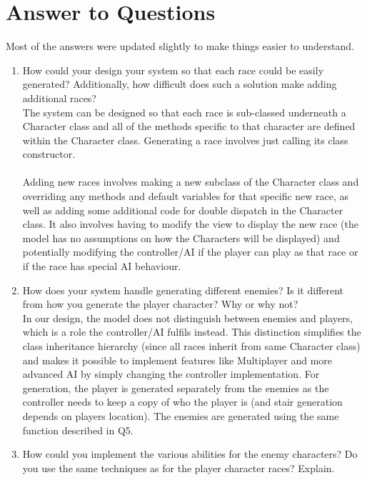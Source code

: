 \documentclass[12pt]{article}
\begin{document}
\section*{Answer to Questions}
Most of the answers were updated slightly to make things easier to understand.
\begin{enumerate}
\item How could your design your system so that each race could be easily generated? Additionally, how difficult does such a solution make adding additional races?\\

The system can be designed so that each race is sub-classed underneath a Character class and all of the methods specific to that character are defined within the Character class. Generating a race involves just calling its class constructor. \\
\\
Adding new races involves making a new subclass of the Character class and overriding any methods and default variables for that specific new race, as well as adding some additional code for double dispatch in the Character class. It also involves having to modify the view to display the new race (the model has no assumptions on how the Characters will be displayed) and potentially modifying the controller/AI if the player can play as that race or if the race has special AI behaviour. 

\item How does your system handle generating different enemies? Is it different from how you generate the player character? Why or why not? \\


In our design, the model does not distinguish between enemies and players, which is a role the controller/AI fulfils instead. This distinction simplifies the class inheritance hierarchy (since all races inherit from same Character class) and makes it possible to implement features like Multiplayer and more advanced AI by simply changing the controller implementation. For generation, the player is generated separately from the enemies as the controller needs to keep a copy of who the player is (and stair generation depends on players location). The enemies are generated using the same function described in Q5.

\item How could you implement the various abilities for the enemy characters? Do you use the same techniques as for the player character races? Explain.\\



\end{enumerate}
\end{document}

